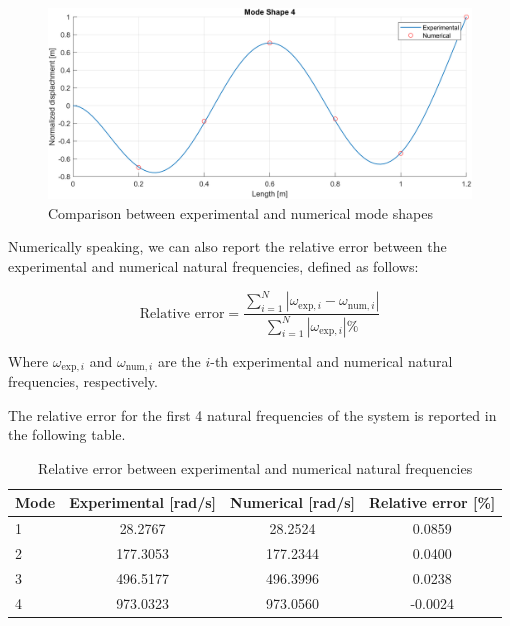 \begin{figure}[H]
    \begin{minipage}[b]{0.45\textwidth}
        \centering
        \includegraphics[width=\textwidth]{img/MATLAB/Part_A/Comparison_ModeShape_04.png}
    \end{minipage}
    \caption{Comparison between experimental and numerical mode shapes}
    \label{fig:Mode_shapes_comparison}
\end{figure}

Numerically speaking, we can also report the relative error between the experimental and numerical natural frequencies, defined as follows:

\begin{equation}
    \text{Relative error} = \frac{\sum_{i=1}^{N} \left| \omega_{\text{exp},i} - \omega_{\text{num},i} \right|}{\sum_{i=1}^{N} \left| \omega_{\text{exp},i} \right| \%}
\end{equation}

Where $\omega_{\text{exp},i}$ and $\omega_{\text{num},i}$ are the $i$-th experimental and numerical natural frequencies, respectively.

The relative error for the first 4 natural frequencies of the system is reported in the following table.

\begin{table}[H]
    \centering
    \begin{tabular}{lccc}
        \hline
        Mode & Experimental [rad/s] & Numerical [rad/s] & Relative error [\%] \\
        \hline
        1    & 28.2767              & 28.2524           & 0.0859              \\
        2    & 177.3053             & 177.2344          & 0.0400              \\
        3    & 496.5177             & 496.3996          & 0.0238              \\
        4    & 973.0323             & 973.0560          & -0.0024             \\
        \hline
    \end{tabular}
    \caption{Relative error between experimental and numerical natural frequencies}
    \label{tab:Relative_error_frequencies}
\end{table}
